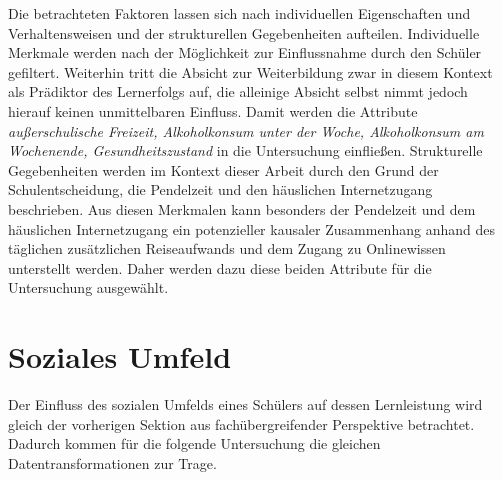 Die betrachteten Faktoren lassen sich nach individuellen Eigenschaften und Verhaltensweisen und der strukturellen Gegebenheiten aufteilen.
Individuelle Merkmale werden nach der Möglichkeit zur Einflussnahme durch den Schüler gefiltert.
Weiterhin tritt die Absicht zur Weiterbildung zwar in diesem Kontext als Prädiktor des Lernerfolgs auf, die alleinige Absicht selbst nimmt jedoch hierauf keinen unmittelbaren Einfluss.
Damit werden die Attribute \textit{außerschulische Freizeit, Alkoholkonsum unter der Woche, Alkoholkonsum am Wochenende, Gesundheitszustand} in die Untersuchung einfließen.
Strukturelle Gegebenheiten werden im Kontext dieser Arbeit durch den Grund der Schulentscheidung, die Pendelzeit und den häuslichen Internetzugang beschrieben.
Aus diesen Merkmalen kann besonders der Pendelzeit und dem häuslichen Internetzugang ein potenzieller kausaler Zusammenhang anhand des täglichen zusätzlichen Reiseaufwands und dem Zugang zu Onlinewissen unterstellt werden.
Daher werden dazu diese beiden Attribute für die Untersuchung ausgewählt.

\section{Soziales Umfeld}


Der Einfluss des sozialen Umfelds eines Schülers auf dessen Lernleistung wird gleich der vorherigen Sektion aus fachübergreifender Perspektive betrachtet.
Dadurch kommen für die folgende Untersuchung die gleichen Datentransformationen zur Trage.

